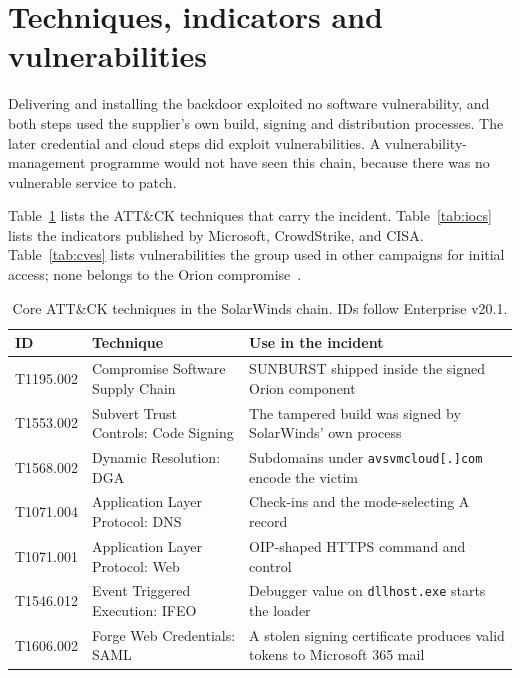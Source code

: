 \section{Techniques, indicators and vulnerabilities}
\label{sec:techniques}

Delivering and installing the backdoor exploited no software vulnerability, and both steps used the supplier's own build, signing and distribution processes. The later credential and cloud steps did exploit vulnerabilities. A vulnerability-management programme would not have seen this chain, because there was no vulnerable service to patch.

Table~\ref{tab:attack} lists the ATT\&CK techniques that carry the incident. Table~\ref{tab:iocs} lists the indicators published by Microsoft, CrowdStrike, and CISA. Table~\ref{tab:cves} lists vulnerabilities the group used in other campaigns for initial access; none belongs to the Orion compromise~\cite{nsa-svr}.

\begin{table}[H]
\centering
\footnotesize
{}
\caption{Core ATT\&CK techniques in the SolarWinds chain. IDs follow Enterprise v20.1.}
\label{tab:attack}
\begin{tabular}{@{}>{\RaggedRight}p{1.8cm}>{\RaggedRight}p{5.3cm}>{\RaggedRight}p{7.4cm}@{}}
\toprule
\textbf{ID} & \textbf{Technique} & \textbf{Use in the incident} \\
\midrule
T1195.002 & Compromise Software Supply Chain & SUNBURST shipped inside the signed Orion component~\cite{mandiant-campaign} \\
T1553.002 & Subvert Trust Controls: Code Signing & The tampered build was signed by SolarWinds' own process~\cite{crowdstrike-sunspot} \\
T1568.002 & Dynamic Resolution: DGA & Subdomains under \texttt{avsvmcloud[.]com} encode the victim~\cite{mandiant-sunburst-details} \\
T1071.004 & Application Layer Protocol: DNS & Check-ins and the mode-selecting A record~\cite{mandiant-sunburst-details} \\
T1071.001 & Application Layer Protocol: Web & OIP-shaped HTTPS command and control~\cite{mandiant-sunburst-details} \\
T1546.012 & Event Triggered Execution: IFEO & Debugger value on \texttt{dllhost.exe} starts the loader~\cite{microsoft-teardrop} \\
T1606.002 & Forge Web Credentials: SAML & A stolen signing certificate produces valid tokens to Microsoft 365 mail~\cite{cisa-aa20-352a} \\
\bottomrule
\end{tabular}
\end{table}

